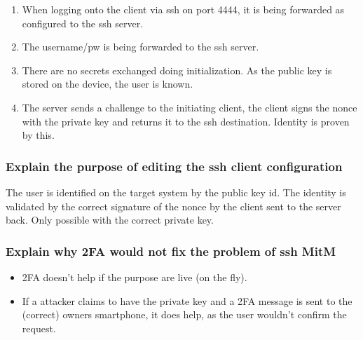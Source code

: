 \begin{enumerate}
    \item When logging onto the client via ssh on port 4444, it is being forwarded as configured to the ssh server.
    \item The username/pw is being forwarded to the ssh server.
    \item There are no secrets exchanged doing initialization. As the public key is stored on the device, the user is \glqq known\grqq.
    \item The server sends a challenge to the initiating client, the client signs the nonce with the private key and returns it
    to the ssh destination. Identity is proven by this.
\end{enumerate}

\subsubsection{Explain the purpose of editing the ssh client configuration}
The user is identified on the target system by the public key id. The identity is validated by the correct signature of the nonce by the client sent to the server back. Only possible with the correct private key.

\subsubsection{Explain why 2FA would not fix the problem of ssh MitM}
\begin{itemize}
    \item 2FA doesn't help if the purpose are live (on the fly).
    \item If a attacker claims to have the private key and a 2FA message is sent to the (correct) owners smartphone, it does help, as the user wouldn't confirm the request.
\end{itemize}

